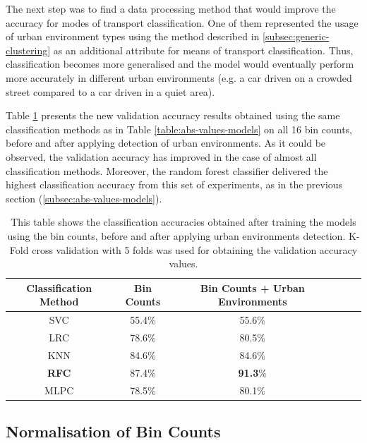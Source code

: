 \documentclass[bsc,frontabs,twoside,singlespacing, parskip,deptreport]{infthesis}     %
\begin{document}
The next step was to find a data processing method that would improve the accuracy for modes of transport classification. One of them represented the usage of urban environment types using the method described in \ref{subsec:generic-clustering} as an additional attribute for means of transport classification. Thus, classification becomes more generalised and the model would eventually perform more accurately in different urban environments (e.g. a car driven on a crowded street compared to a car driven in a quiet area).

Table \ref{table:urban-env-models} presents the new validation accuracy results obtained using the same classification methods as in Table \ref{table:abs-values-models} on all 16 bin counts, before and after applying detection of urban environments. As it could be observed, the validation accuracy has improved in the case of almost all classification methods. Moreover, the random forest classifier delivered the highest classification accuracy from this set of experiments, as in the previous section (\ref{subsec:abs-values-models}).

\begin{table}[h!]
\centering
 \begin{tabular}{||c | c | c | c | c | c||} 
 \hline
 Classification Method & Bin Counts & Bin Counts + Urban Environments \\ [0.5ex] 
 \hline\hline
 SVC & 55.4\% & 55.6\% \\ 
 \hline
 LRC & 78.6\% & 80.5\% \\
 \hline
 KNN & 84.6\% & 84.6\% \\ 
 \hline
 \textbf{RFC} & 87.4\% & \textbf{91.3}\% \\ 
 \hline
  MLPC & 78.5\% & 80.1\% \\ 
 \hline
\end{tabular}
\caption{This table shows the classification accuracies obtained after training the models using the bin counts, before and after applying urban environments detection. K-Fold cross validation with 5 folds was used for obtaining the validation accuracy values.}
\label{table:urban-env-models}
\end{table}


\subsection{Normalisation of Bin Counts}
\label{subsec:norm-bin-counts-results}
\end{document}
